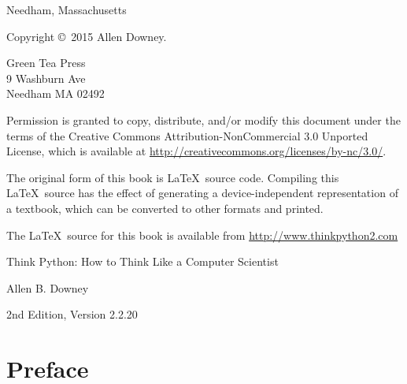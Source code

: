 \documentclass[
DIV=11,
fontsize=13,
twoside,
headinclude=false,
titlepage=firstiscover,
abstract=true,
headsepline=true,
footsepline=true,
chapterprefix=true, %
headings=big,
bibliography=totoc,%
captions=tableheading
]{scrbook}
\newcommand{\thetitle}{Think Python: How to Think Like a Computer Scientist}
\newcommand{\theversion}{2nd Edition, Version 2.2.20}
\newcommand{\thedate}{}
\theoremstyle{definition}
\begin{document}
\begin{latexonly}
\begin{flushright}
{\small Needham, Massachusetts}

\vfill

\end{flushright}


\pagebreak
\thispagestyle{empty}

{\small
Copyright \copyright ~2015 Allen Downey.


\vspace{0.2in}

\begin{flushleft}
Green Tea Press       \\
9 Washburn Ave        \\
Needham MA 02492
\end{flushleft}

Permission is granted to copy, distribute, and/or modify this document
under the terms of the Creative Commons Attribution-NonCommercial 3.0 Unported
License, which is available at \url{http://creativecommons.org/licenses/by-nc/3.0/}.

The original form of this book is \LaTeX\ source code.  Compiling this
\LaTeX\ source has the effect of generating a device-independent
representation of a textbook, which can be converted to other formats
and printed.

The \LaTeX\ source for this book is available from
\url{http://www.thinkpython2.com}

\vspace{0.2in}

} %

\end{latexonly}



\begin{htmlonly}


{\Large \thetitle}

{\large Allen B. Downey}

\theversion

\thedate

\setcounter{chapter}{-1}

\end{htmlonly}

\fi


\chapter{Preface}
\end{document}
